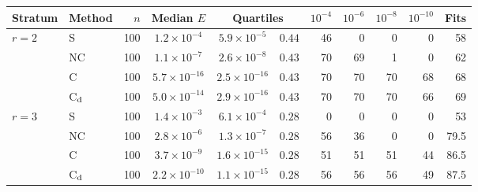 \begin{tabular}{@{}llr ccc rrrr r@{}}
\toprule
Stratum & Method & $n$ & Median $E$ & \multicolumn{2}{c}{Quartiles} & $10^{-4}$ & $10^{-6}$ & $10^{-8}$ & $10^{-10}$ & Fits\\
\midrule
$r=2$ & S & 100 & $1.2\times10^{-4}$ & $5.9\times10^{-5}$ & $0.44$ & 46 & 0 & 0 & 0 & 58\\
 & NC & 100 & $1.1\times10^{-7}$ & $2.6\times10^{-8}$ & $0.43$ & 70 & 69 & 1 & 0 & 62\\
 & C & 100 & $5.7\times10^{-16}$ & $2.5\times10^{-16}$ & $0.43$ & 70 & 70 & 70 & 68 & 68\\
 & C$_{\rm d}$ & 100 & $5.0\times10^{-14}$ & $2.9\times10^{-16}$ & $0.43$ & 70 & 70 & 70 & 66 & 69\\
\midrule
$r=3$ & S & 100 & $1.4\times10^{-3}$ & $6.1\times10^{-4}$ & $0.28$ & 0 & 0 & 0 & 0 & 53\\
 & NC & 100 & $2.8\times10^{-6}$ & $1.3\times10^{-7}$ & $0.28$ & 56 & 36 & 0 & 0 & 79.5\\
 & C & 100 & $3.7\times10^{-9}$ & $1.6\times10^{-15}$ & $0.28$ & 51 & 51 & 51 & 44 & 86.5\\
 & C$_{\rm d}$ & 100 & $2.2\times10^{-10}$ & $1.1\times10^{-15}$ & $0.28$ & 56 & 56 & 56 & 49 & 87.5\\
\bottomrule
\end{tabular}
